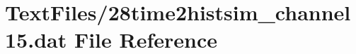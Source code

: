 \hypertarget{28time2histsim__channel15_8dat}{}\section{Text\+Files/28time2histsim\+\_\+channel15.dat File Reference}
\label{28time2histsim__channel15_8dat}
